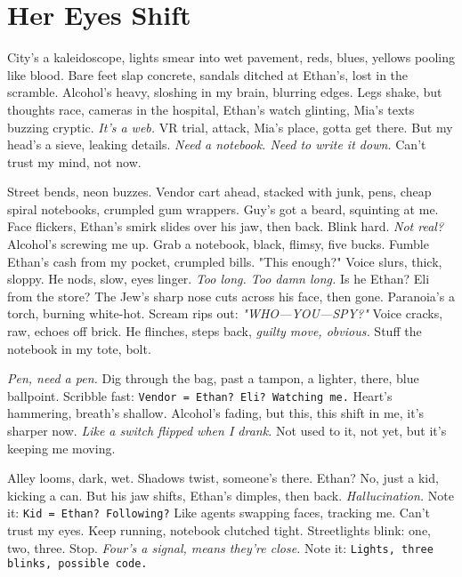 \documentclass[12pt]{article}
\newcommand{\note}[1]{\texttt{#1}}
\begin{document}
\section{Her Eyes Shift}

City’s a kaleidoscope, lights smear into wet pavement, reds, blues, yellows pooling like blood. Bare feet slap concrete, sandals ditched at \textnormal{Ethan}’s, lost in the scramble. Alcohol’s heavy, sloshing in my brain, blurring edges. Legs shake, but thoughts race, cameras in the hospital, \textnormal{Ethan}’s watch glinting, \textnormal{Mia}’s texts buzzing cryptic. \textit{It’s a web.} VR trial, attack, \textnormal{Mia}’s place, gotta get there. But my head’s a sieve, leaking details. \textit{Need a notebook. Need to write it down.} Can’t trust my mind, not now.

Street bends, neon buzzes. Vendor cart ahead, stacked with junk, pens, cheap spiral notebooks, crumpled gum wrappers. Guy’s got a beard, squinting at me. Face flickers, \textnormal{Ethan}’s smirk slides over his jaw, then back. Blink hard. \textit{Not real?} Alcohol’s screwing me up. Grab a notebook, black, flimsy, five bucks. Fumble \textnormal{Ethan}’s cash from my pocket, crumpled bills. "This enough?" Voice slurs, thick, sloppy. He nods, slow, eyes linger. \textit{Too long. Too damn long.} Is he \textnormal{Ethan}? \textnormal{Eli} from the store? The Jew’s sharp nose cuts across his face, then gone. Paranoia’s a torch, burning white-hot. Scream rips out: \textit{"WHO—YOU—SPY?"} Voice cracks, raw, echoes off brick. He flinches, steps back, \textit{guilty move, obvious.} Stuff the notebook in my tote, bolt.

\textit{Pen, need a pen.} Dig through the bag, past a tampon, a lighter, there, blue ballpoint. Scribble fast: \note{Vendor = Ethan? Eli? Watching me.} Heart’s hammering, breath’s shallow. Alcohol’s fading, but this, this shift in me, it’s sharper now. \textit{Like a switch flipped when I drank.} Not used to it, not yet, but it’s keeping me moving.

Alley looms, dark, wet. Shadows twist, someone’s there. \textnormal{Ethan}? No, just a kid, kicking a can. But his jaw shifts, \textnormal{Ethan}’s dimples, then back. \textit{Hallucination.} Note it: \note{Kid = Ethan? Following?} Like agents swapping faces, tracking me. Can’t trust my eyes. Keep running, notebook clutched tight. Streetlights blink: one, two, three. Stop. \textit{Four’s a signal, means they’re close.} Note it: \note{Lights, three blinks, possible code.}
\end{document}
